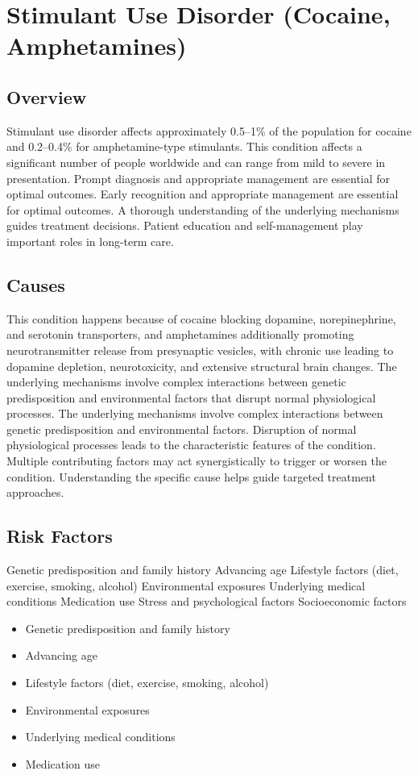 \chapter{Stimulant Use Disorder (Cocaine, Amphetamines)}
\label{sec:Stimulant Use Disorder (Cocaine, Amphetamines)}

\section{Overview}
Stimulant use disorder affects approximately 0.5--1\% of the population for cocaine and 0.2--0.4\% for amphetamine-type stimulants. This condition affects a significant number of people worldwide and can range from mild to severe in presentation. Prompt diagnosis and appropriate management are essential for optimal outcomes. Early recognition and appropriate management are essential for optimal outcomes. A thorough understanding of the underlying mechanisms guides treatment decisions. Patient education and self-management play important roles in long-term care.
\section{Causes}
This condition happens because of cocaine blocking dopamine, norepinephrine, and serotonin transporters, and amphetamines additionally promoting neurotransmitter release from presynaptic vesicles, with chronic use leading to dopamine depletion, neurotoxicity, and extensive structural brain changes. The underlying mechanisms involve complex interactions between genetic predisposition and environmental factors that disrupt normal physiological processes. The underlying mechanisms involve complex interactions between genetic predisposition and environmental factors. Disruption of normal physiological processes leads to the characteristic features of the condition. Multiple contributing factors may act synergistically to trigger or worsen the condition. Understanding the specific cause helps guide targeted treatment approaches.
\section{Risk Factors}
Genetic predisposition and family history Advancing age Lifestyle factors (diet, exercise, smoking, alcohol) Environmental exposures Underlying medical conditions Medication use Stress and psychological factors Socioeconomic factors

\begin{itemize}[noitemsep]
  \item Genetic predisposition and family history
  \item Advancing age
  \item Lifestyle factors (diet, exercise, smoking, alcohol)
  \item Environmental exposures
  \item Underlying medical conditions
  \item Medication use
\end{itemize}
